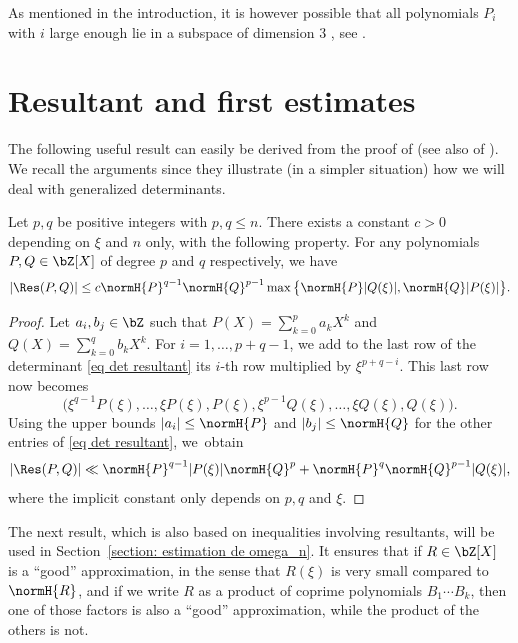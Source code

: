 \begin{Rem}
As mentioned in the introduction, it is however possible that all polynomials $P_i$ with $i$ large enough lie in a subspace of dimension $3$ , see \cite[Th.\,1.3]{moshchevitin2007best}.
\end{Rem}

\section{Resultant and first estimates}
\label{section: resultant et premier resultat}

The following useful result can easily be derived from the proof of \cite[\S 5]{davenport1969approximation} (see also of \cite[Lem.\,1]{brownawell1974sequences}). We recall the arguments since they illustrate (in a simpler situation) how we will deal with generalized determinants.

\begin{Lem}
\label{lem: estimation classique du resultant}
Let $p,q$ be positive integers with $p,q\leq n$. There exists a constant $c>0$ depending on $\xi$ and $n$ only, with the following property. For any polynomials $P,Q\in\bZ[X]$ of degree $p$ and $q$ respectively, we have
\begin{equation*}
|\Res(P,Q)| \leq c \normH{P}^{q-1}\normH{Q}^{p-1} \max\big\{\normH{P}|Q(\xi)|, \normH{Q}|P(\xi)| \big\}.
\end{equation*}
\end{Lem}

\begin{proof}
Let $a_i,b_j\in \bZ$ such that $P(X) = \sum_{k=0}^{p} a_kX^k$ and $Q(X) = \sum_{k=0}^{q} b_kX^k$. For $i=1,\dots,p+q-1$, we add to the last row of the determinant \eqref{eq det resultant} its $i$-th row multiplied by $\xi^{p+q-i}$. This last row now becomes
\begin{equation*}
\Big(\xi^{q-1}P(\xi), \dots, \xi P(\xi), P(\xi), \xi^{p-1}Q(\xi), \dots, \xi Q(\xi), Q(\xi)\Big).
\end{equation*}
Using the upper bounds $|a_i| \leq \normH{P}$ and $|b_j|\leq \normH{Q}$ for the other entries of \eqref{eq det resultant}, we~obtain
\begin{equation*}
|\Res(P,Q)| \ll \normH{P}^{q-1}|P(\xi)| \normH{Q}^p + \normH{P}^q\normH{Q}^{p-1}|Q(\xi)|,
\end{equation*}
where the implicit constant only depends on $p, q$ and $\xi$.
\end{proof}

The next result, which is also based on inequalities involving resultants, will be used in Section~\ref{section: estimation de omega_n}. It ensures that if $R\in\bZ[X]$ is a ``good'' approximation, in the sense that $R(\xi)$ is very small compared to $\normH{R}$, and if we write $R$ as a product of coprime polynomials $B_1\cdots B_k$, then one of those factors is also a ``good'' approximation, while the product of the others is not.

